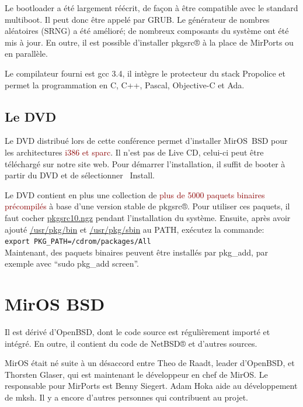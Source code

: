 \documentclass[a4paper,landscape,11pt,notumble]{leaflet}
\begin{document}
Le bootloader a été largement réécrit, de façon à être compatible avec le standard multiboot. Il peut donc être appelé par GRUB. 
Le générateur de nombres aléatoires (SRNG) a été amélioré; de nombreux composants du système ont été mis à jour. 
En outre, il est possible d’installer pkgsrc® à la place de MirPorts ou en parallèle.

Le compilateur fourni est gcc 3.4, il intègre le protecteur du stack Propolice et permet la programmation en C, C++, Pascal, Objective-C et Ada.

\subsection{Le DVD}

\noindent
Le DVD distribué lors de cette conférence permet d'installer MirOS~BSD pour les architectures \textcolor{darkred}{i386 et sparc}.
Il n'est pas de Live CD, celui-ci peut être téléchargé sur notre site web.
Pour démarrer l'installation, il suffit de booter à partir du DVD et de sélectionner \flqq~Install\frqq.

Le DVD contient en plus une collection de \textcolor{darkred}{plus de 5000 paquets binaires précompilés} à base d'une version stable de pkgsrc®.
Pour utiliser ces paquets, il faut cocher \url{pkgsrc10.ngz} pendant l'installation du système.
Ensuite, après avoir ajouté \url{/usr/pkg/bin} et \url{/usr/pkg/sbin} au PATH, exécutez la commande:\\
%
\verb,export PKG_PATH=/cdrom/packages/All,\\
%
Maintenant, des paquets binaires peuvent être installés par pkg\_add, par exemple avec ``sudo pkg\_add screen''.

\newpage

\section{MirOS BSD}

\noindent
{}

\noindent
Il est dérivé d’OpenBSD, dont le code source est régulièrement importé et intégré. En outre, il contient du code de NetBSD® et d’autres sources.

MirOS était né suite à un désaccord entre Theo de Raadt, leader d’OpenBSD, et Thorsten Glaser, qui est maintenant le développeur en chef de MirOS. Le responsable pour MirPorts est Benny Siegert. Adam Hoka aide au développement de mksh. Il y a encore d’autres personnes qui contribuent au projet.
\end{document}
